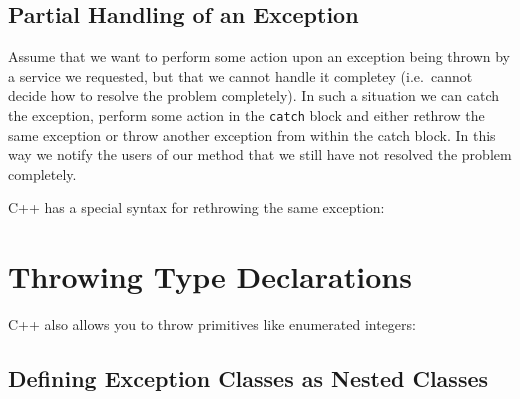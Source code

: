 \subsection{Partial Handling of an Exception}

Assume that we want to perform some action upon an exception being thrown by 
a service we requested, but that we cannot handle it completey (i.e.\ cannot
decide how to resolve the problem completely). In such a situation we can
catch the exception, perform some action in the \verb+catch+ block and either
rethrow the same exception or throw another exception from within the catch
block. In this way we notify the users of our method that we still have not
resolved the problem completely.

C++ has a special syntax for rethrowing the same exception:



\section{Throwing Type Declarations}

C++ also allows you to throw primitives like enumerated integers:



\subsection{Defining Exception Classes as Nested Classes}

